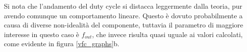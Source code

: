 Si nota che l'andamento del duty cycle si distacca leggermente dalla teoria, pur avendo
comunque un comportamento lineare. Questo è dovuto probabilmente a causa di diverse
non-idealità del componente, tuttavia il parametro di maggiore interesse in questo caso è
$f_{out}$, che invece risulta quasi uguale ai valori calcolati, come evidente in figura
\ref{vfc_graphs}b.

